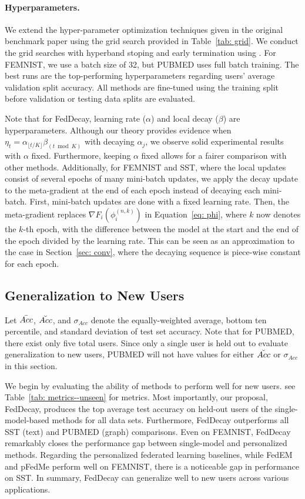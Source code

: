 \documentclass{article}
\begin{document}
\paragraph{Hyperparameters.}
We extend the hyper-parameter optimization techniques given in the original benchmark paper using the grid search provided in Table~\ref{tab: grid}. 
We conduct the grid searches with hyperband stoping and early termination using \cite{wandb}.
For FEMNIST, we use a batch size of 32, but PUBMED uses full batch training. 
The best runs are the top-performing hyperparameters regarding users' average validation split accuracy.
All methods are fine-tuned using the training split before validation or testing data splits are evaluated. 


\medskip
Note that for FedDecay, learning rate ($\alpha$) and local decay ($\beta$) are hyperparameters. 
Although our theory provides evidence when $\eta_t = \alpha_{\lfloor t/K \rfloor} \beta_{(t \bmod K)}$ with decaying $\alpha_j$, we observe solid experimental results with $\alpha$ fixed.
Furthermore, keeping $\alpha$ fixed allows for a fairer comparison with other methods. 
Additionally, for FEMNIST and SST, where the local updates consist of several epochs of many mini-batch updates, we apply the decay update to the meta-gradient at the end of each epoch instead of decaying each mini-batch.
First, mini-batch updates are done with a fixed learning rate.
Then, the meta-gradient replaces $\nabla F_i(\phi_i^{(n, k)})$ in Equation~\ref{eq: phi}, where $k$ now denotes the $k$-th epoch, with the difference between the model at the start and the end of the epoch divided by the learning rate.
This can be seen as an approximation to the case in Section~\ref{sec: conv}, where the decaying sequence is piece-wise constant for each epoch. 


\subsection{Generalization to New Users}
\label{sec: unseen}

Let $\Bar{Acc}$, $\Breve{Acc}$, and $\sigma_{Acc}$ denote the equally-weighted average, bottom ten percentile, and standard deviation of test set accuracy.
Note that for PUBMED, there exist only five total users. 
Since only a single user is held out to evaluate generalization to new users, PUBMED will not have values for either $\Breve{Acc}$ or $\sigma_{Acc}$ in this section.

\medskip
We begin by evaluating the ability of methods to perform well for new users. 
see Table~\ref{tab: metrics--unseen} for metrics. 
Most importantly, our proposal, FedDecay, produces the top average test accuracy on held-out users of the single-model-based methods for all data sets.
Furthermore, FedDecay outperforms all SST (text) and PUBMED (graph) comparisons.
Even on FEMNIST, FedDecay remarkably closes the performance gap between single-model and personalized methods.
Regarding the personalized federated learning baselines, while FedEM and pFedMe perform well on FEMNIST, there is a noticeable gap in performance on SST. 
In summary, FedDecay can generalize well to new users across various applications.

\end{document}
